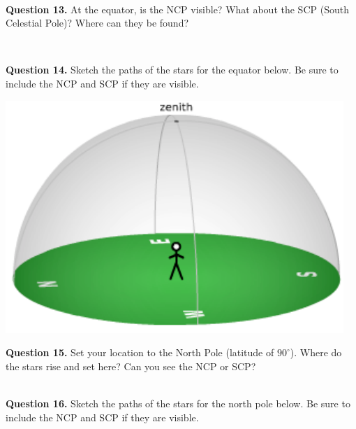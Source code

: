 \documentclass[11pt]{article}
\begin{document}
\hrulefill\\

\textbf{Question 13.} At the equator, is the NCP visible? What about the SCP (South Celestial Pole)? Where can they be found? \\
\vspace*{1.5cm}

\hrulefill\\

\newpage

\textbf{Question 14.} Sketch the paths of the stars for the equator below. Be sure to include the NCP and SCP if they are visible. \\
\vspace*{1.5cm}

\begin{center}
	\includegraphics{local_sky} 
\end{center}

\textbf{Question 15.} Set your location to the North Pole (latitude of $90^\circ$). Where do the stars rise and set here? Can you see the NCP or SCP?\\
\vspace*{1.5cm}

\hrulefill\\

\textbf{Question 16.} Sketch the paths of the stars for the north pole below. Be sure to include the NCP and SCP if they are visible. \\
\vspace*{1.5cm}
\end{document}
